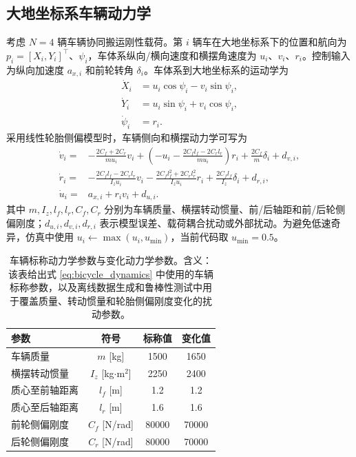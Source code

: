 \documentclass[twocolumn,3p,times,procedia]{elsarticle}
\begin{document}
\subsection{大地坐标系车辆动力学}

考虑 $N=4$ 辆车辆协同搬运刚性载荷。第 $i$ 辆车在大地坐标系下的位置和航向为
$p_i=[X_i,Y_i]^\top$、$\psi_i$，车体系纵向/横向速度和横摆角速度为 $u_i$、$v_i$、$r_i$。控制输入为纵向加速度 $a_{x,i}$ 和前轮转角 $\delta_i$。车体系到大地坐标系的运动学为
\begin{equation}
\begin{aligned}
\dot X_i &= u_i\cos\psi_i-v_i\sin\psi_i,\\
\dot Y_i &= u_i\sin\psi_i+v_i\cos\psi_i,\\
\dot \psi_i &= r_i .
\end{aligned}
\label{eq:world_kinematics}
\end{equation}
采用线性轮胎侧偏模型时，车辆侧向和横摆动力学可写为
\begin{equation}
\begin{aligned}
\dot v_i=&-\frac{2C_f+2C_r}{m u_i}v_i+
\left(-u_i-\frac{2C_f l_f-2C_r l_r}{m u_i}\right)r_i
+\frac{2C_f}{m}\delta_i+d_{v,i},\\
\dot r_i=&-\frac{2C_f l_f-2C_r l_r}{I_z u_i}v_i
-\frac{2C_f l_f^2+2C_r l_r^2}{I_z u_i}r_i
+\frac{2C_f l_f}{I_z}\delta_i+d_{r,i},\\
\dot u_i=&a_{x,i}+r_i v_i+d_{u,i}.
\end{aligned}
\label{eq:bicycle_dynamics}
\end{equation}
其中 $m,I_z,l_f,l_r,C_f,C_r$ 分别为车辆质量、横摆转动惯量、前/后轴距和前/后轮侧偏刚度；$d_{u,i},d_{v,i},d_{r,i}$ 表示模型误差、载荷耦合扰动或外部扰动。为避免低速奇异，仿真中使用 $u_i\leftarrow\max(u_i,u_{\min})$，当前代码取 $u_{\min}=0.5$。

\begin{table}[!tbp]
\centering
\caption{车辆标称动力学参数与变化动力学参数。含义：该表给出式 \eqref{eq:bicycle_dynamics} 中使用的车辆标称参数，以及离线数据生成和鲁棒性测试中用于覆盖质量、转动惯量和轮胎侧偏刚度变化的扰动参数。}
\label{tab:vehicle_dynamic_params}
\footnotesize
\begin{tabular}{lccc}
\toprule
参数 & 符号 & 标称值 & 变化值 \\
\midrule
车辆质量 & $m$ [kg] & 1500 & 1650\\
横摆转动惯量 & $I_z$ [kg$\cdot$m$^2$] & 2250 & 2400\\
质心至前轴距离 & $l_f$ [m] & 1.2 & 1.2\\
质心至后轴距离 & $l_r$ [m] & 1.6 & 1.6\\
前轮侧偏刚度 & $C_f$ [N/rad] & 80000 & 70000\\
后轮侧偏刚度 & $C_r$ [N/rad] & 80000 & 70000\\
\bottomrule
\end{tabular}
\end{table}
\end{document}
